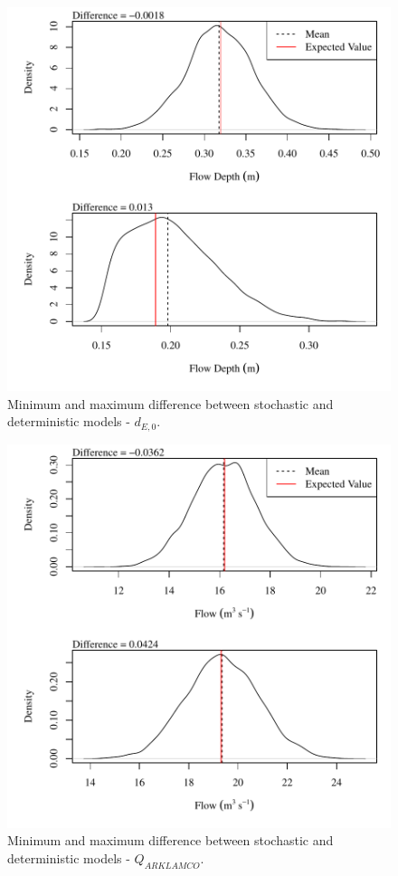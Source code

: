 \begin{center}
\begin{figure}[htbp]
	\includegraphics[width=6in]{"Figures/Results_USR/V min-max diff depthE1"}
	\caption{Minimum and maximum difference between stochastic and deterministic models - $d_{E,0}$.}
\end{figure}
\end{center}
\newpage

\begin{center}
\begin{figure}[htbp]
	\includegraphics[width=6in]{"Figures/Results_DSR/V min-max diff qin"}
	\caption{Minimum and maximum difference between stochastic and deterministic models - $Q_{ARKLAMCO}$.}
\end{figure}
\end{center}
\newpage

